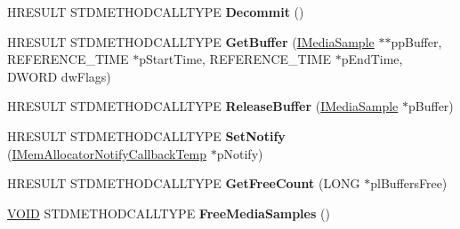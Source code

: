 \begin{DoxyCompactItemize}
\item 
\mbox{\label{class_c_ks_allocator_a0855aba35f9581364888ac29fdde9db5}} 
H\+R\+E\+S\+U\+LT S\+T\+D\+M\+E\+T\+H\+O\+D\+C\+A\+L\+L\+T\+Y\+PE {\bfseries Decommit} ()
\item 
\mbox{\label{class_c_ks_allocator_ac2ae2b863cb82707e3126e1be8242eee}} 
H\+R\+E\+S\+U\+LT S\+T\+D\+M\+E\+T\+H\+O\+D\+C\+A\+L\+L\+T\+Y\+PE {\bfseries Get\+Buffer} (\hyperlink{interface_i_media_sample}{I\+Media\+Sample} $\ast$$\ast$pp\+Buffer, R\+E\+F\+E\+R\+E\+N\+C\+E\+\_\+\+T\+I\+ME $\ast$p\+Start\+Time, R\+E\+F\+E\+R\+E\+N\+C\+E\+\_\+\+T\+I\+ME $\ast$p\+End\+Time, D\+W\+O\+RD dw\+Flags)
\item 
\mbox{\label{class_c_ks_allocator_a6539438542d24480940a3aaeed841f4a}} 
H\+R\+E\+S\+U\+LT S\+T\+D\+M\+E\+T\+H\+O\+D\+C\+A\+L\+L\+T\+Y\+PE {\bfseries Release\+Buffer} (\hyperlink{interface_i_media_sample}{I\+Media\+Sample} $\ast$p\+Buffer)
\item 
\mbox{\label{class_c_ks_allocator_a24e223f736938249d03fc85a436fcb51}} 
H\+R\+E\+S\+U\+LT S\+T\+D\+M\+E\+T\+H\+O\+D\+C\+A\+L\+L\+T\+Y\+PE {\bfseries Set\+Notify} (\hyperlink{interface_i_mem_allocator_notify_callback_temp}{I\+Mem\+Allocator\+Notify\+Callback\+Temp} $\ast$p\+Notify)
\item 
\mbox{\label{class_c_ks_allocator_a1589d4f08d01c364bc6bc590c2f9243a}} 
H\+R\+E\+S\+U\+LT S\+T\+D\+M\+E\+T\+H\+O\+D\+C\+A\+L\+L\+T\+Y\+PE {\bfseries Get\+Free\+Count} (L\+O\+NG $\ast$pl\+Buffers\+Free)
\item 
\mbox{\label{class_c_ks_allocator_a05e3f0dd111a2ba976eb511e232fd72c}} 
\hyperlink{interfacevoid}{V\+O\+ID} S\+T\+D\+M\+E\+T\+H\+O\+D\+C\+A\+L\+L\+T\+Y\+PE {\bfseries Free\+Media\+Samples} ()
\end{DoxyCompactItemize}
